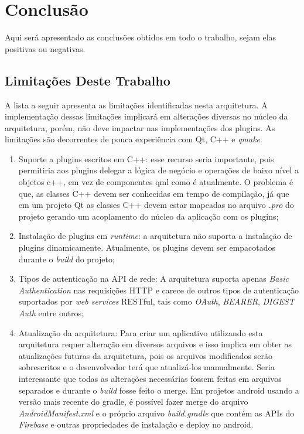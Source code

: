 \section{Conclusão}\label{sec:conclusao}
Aqui será apresentado as conclusões obtidos em todo o trabalho, sejam elas positivas ou negativas.


\subsection{Limitações Deste Trabalho}
A lista a seguir apresenta as limitações identificadas nesta arquitetura. A implementação dessas limitações implicará em alterações diversas no núcleo da arquitetura, porém, não deve impactar nas implementações dos plugins. As limitações são decorrentes de pouca experiência com Qt, C++ e \textit{qmake}.

\begin{enumerate}
	\item Suporte a plugins escritos em C++: esse recurso seria importante, pois permitiria aos plugins delegar a lógica de negócio e operações de baixo nível a objetos c++, em vez de componentes qml como é atualmente. O problema é que, as classes C++ devem ser conhecidas em tempo de compilação, já que em um projeto Qt as classes C++ devem estar mapeadas no arquivo \textit{.pro} do projeto gerando um acoplamento do núcleo da aplicação com os plugins;

	\item Instalação de plugins em \textit{runtime}: a arquitetura não suporta a instalação de plugins dinamicamente. Atualmente, os plugins devem ser empacotados durante o \textit{build} do projeto;

	\item Tipos de autenticação na API de rede: A arquitetura suporta apenas \textit{Basic Authentication} nas requisições HTTP e carece de outros tipos de autenticação suportados por \textit{web services} RESTful, tais como \textit{OAuth}, \textit{BEARER}, \textit{DIGEST Auth} entre outros;

	\item Atualização da arquitetura: Para criar um aplicativo utilizando esta arquitetura requer alteração em diversos arquivos e isso implica em obter as atualizações futuras da arquitetura, pois os arquivos modificados serão sobrescritos e o desenvolvedor terá que atualizá-los manualmente. Seria interessante que todas as alterações necessárias fossem feitas em arquivos separados e durante o \textit{build} fosse feito o merge. Em projetos android usando a versão mais recente do gradle, é possível fazer merge do arquivo \textit{AndroidManifest.xml} e o próprio arquivo \textit{build.gradle} que contém as APIs do \textit{Firebase} e outras propriedades de instalação e deploy no android.
\end{enumerate}


